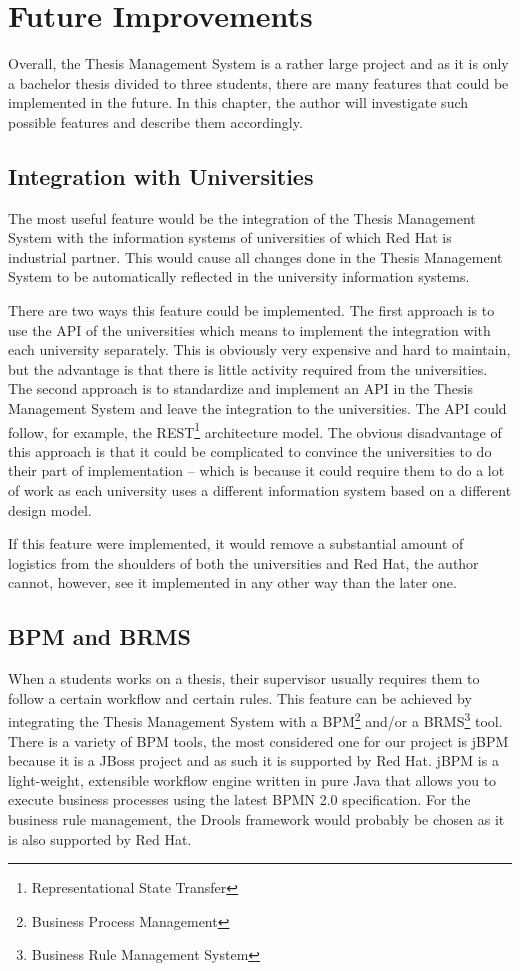 \chapter{Future Improvements}

Overall, the Thesis Management System is a rather large project and as it is only a bachelor thesis divided to three students, there are many features that could be implemented in the future. In this chapter, the author will investigate such possible features and describe them accordingly.

\section{Integration with Universities}

The most useful feature would be the integration of the Thesis Management System with the information systems of universities of which Red Hat is industrial partner. This would cause all changes done in the Thesis Management System to be automatically reflected in the university information systems. 

There are two ways this feature could be implemented. The first approach is to use the API of the universities which means to implement the integration with each university separately. This is obviously very expensive and hard to maintain, but the advantage is that there is little activity required from the universities. The second approach is to standardize and implement an API in the Thesis Management System and leave the integration to the universities. The API could follow, for example, the REST\footnote{Representational State Transfer} architecture model. The obvious disadvantage of this approach is that it could be complicated to convince the universities to do their part of implementation -- which is because it could require them to do a lot of work as each university uses a different information system based on a different design model. 

If this feature were implemented, it would remove a substantial amount of logistics from the shoulders of both the universities and Red Hat, the author cannot, however, see it implemented in any other way than the later one.

\section{BPM and BRMS}

When a students works on a thesis, their supervisor usually requires them to follow a certain workflow and certain rules. This feature can be achieved by integrating the Thesis Management System with a BPM\footnote{Business Process Management} and/or a BRMS\footnote{Business Rule Management System} tool. There is a variety of BPM tools, the most considered one for our project is jBPM because it is a JBoss project and as such it is supported by Red Hat. jBPM is a light-weight, extensible workflow engine written in pure Java that allows you to execute business processes using the latest BPMN 2.0 specification\cite{jbpm-homepage}. For the business rule management, the Drools framework would probably be chosen as it is also supported by Red Hat. 

